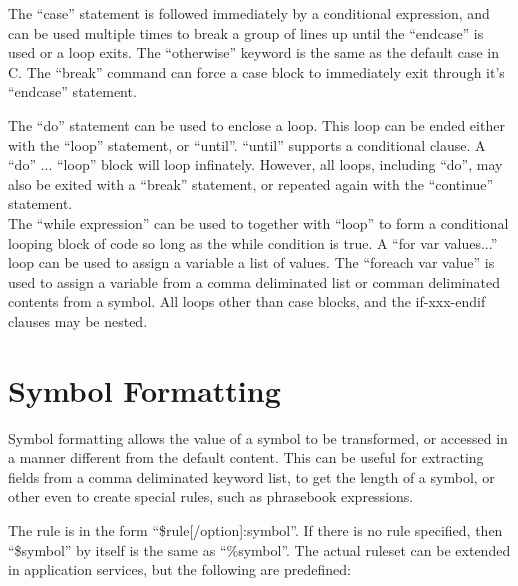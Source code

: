 \documentclass[a4paper,12pt]{article}
\begin{document}
The ``case'' statement is followed immediately by a conditional
expression, and can be used multiple times to break a group of lines up
until the ``endcase'' is used or a loop exits.  The ``otherwise'' keyword 
is the same as the default case in C.  The ``break'' command can force a 
case block to immediately exit through it's ``endcase'' statement.

The ``do'' statement can be used to enclose a loop.  This loop can be ended
either with the ``loop'' statement, or ``until''.  ``until'' supports a
conditional clause.  A ``do'' ... ``loop'' block will loop infinately.
However, all loops, including ``do'', may also be exited with a ``break''
statement, or repeated again with the ``continue'' statement. \\

The ``while expression'' can be used to together with ``loop'' to form a
conditional looping block of code so long as the while condition is true.  A
``for var values...'' loop can be used to assign a variable a list of values.
The ``foreach var value'' is used to assign a variable from a comma deliminated
list or comman deliminated contents from a symbol.  All loops other than
case blocks, and the if-xxx-endif clauses may be nested. \\

\section{Symbol Formatting}

Symbol formatting allows the value of a symbol to be transformed, or accessed
in a manner different from the default content.  This can be useful for
extracting fields from a comma deliminated keyword list, to get the length of
a symbol, or other even to create special rules, such as phrasebook
expressions.  

The rule is in the form ``\$rule[/option]:symbol''.  If there is no rule
specified, then ``\$symbol'' by itself is the same as ``\%symbol''.  The actual
ruleset can be extended in application services, but the following are
predefined:
\end{document}
